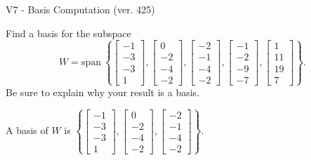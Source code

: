 \begin{exercise}
  \begin{exerciseTitle}V7 - Basis Computation (ver. 425)\end{exerciseTitle}
  \begin{exerciseStatement}
    Find a basis for the subspace 
\[W=\mathrm{span}\ \left\{\left[\begin{array}{r}
-1 \\
-3 \\
-3 \\
1
\end{array}\right] , \left[\begin{array}{r}
0 \\
-2 \\
-4 \\
-2
\end{array}\right] , \left[\begin{array}{r}
-2 \\
-1 \\
-4 \\
-2
\end{array}\right] , \left[\begin{array}{r}
-1 \\
-2 \\
-9 \\
-7
\end{array}\right] , \left[\begin{array}{r}
1 \\
11 \\
19 \\
7
\end{array}\right]\right\}.\]
 Be sure to explain why your result is a basis.


  \end{exerciseStatement}
  \begin{exerciseAnswer}
   A basis of \(W\) is  \(\left\{\left[\begin{array}{r}
-1 \\
-3 \\
-3 \\
1
\end{array}\right] , \left[\begin{array}{r}
0 \\
-2 \\
-4 \\
-2
\end{array}\right] , \left[\begin{array}{r}
-2 \\
-1 \\
-4 \\
-2
\end{array}\right]\right\}\).
  


  \end{exerciseAnswer}
\end{exercise}